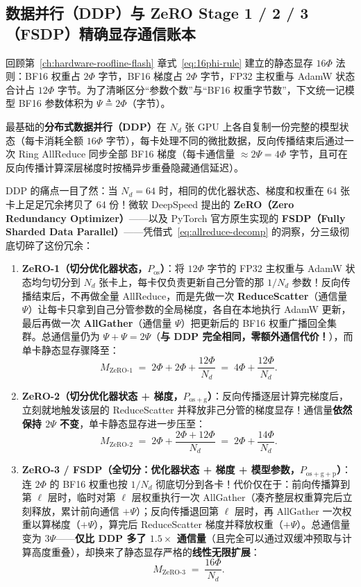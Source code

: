 \subsection{数据并行（DDP）与 ZeRO Stage 1 / 2 / 3（FSDP）精确显存通信账本}

回顾第~\ref{ch:hardware-roofline-flash} 章式~\eqref{eq:16phi-rule} 建立的静态显存 $16\Phi$ 法则：BF16 权重占 $2\Phi$ 字节，BF16 梯度占 $2\Phi$ 字节，FP32 主权重与 AdamW 状态合计占 $12\Phi$ 字节。为了清晰区分“参数个数”与“BF16 权重字节数”，下文统一记模型 BF16 参数体积为 $\Psi \triangleq 2\Phi$（字节）。

最基础的\textbf{分布式数据并行（DDP）}在 $N_d$ 张 GPU 上各自复制一份完整的模型状态（每卡消耗全额 $16\Phi$ 字节），每卡处理不同的微批数据，反向传播结束后通过一次 Ring AllReduce 同步全部 BF16 梯度（每卡通信量 $\approx 2\Psi = 4\Phi$ 字节，且可在反向传播计算深层梯度时按桶异步重叠隐藏通信延迟）。

DDP 的痛点一目了然：当 $N_d = 64$ 时，相同的优化器状态、梯度和权重在 64 张卡上足足冗余拷贝了 64 份！微软 DeepSpeed 提出的 \textbf{ZeRO（Zero Redundancy Optimizer）}——以及 PyTorch 官方原生实现的 \textbf{FSDP（Fully Sharded Data Parallel）}——凭借式~\eqref{eq:allreduce-decomp} 的洞察，分三级彻底切碎了这份冗余：
\begin{enumerate}
  \item \textbf{ZeRO-1（切分优化器状态，$P_{\mathrm{os}}$）}：将 $12\Phi$ 字节的 FP32 主权重与 AdamW 状态均匀切分到 $N_d$ 张卡上，每卡仅负责更新自己分管的那 $1/N_d$ 参数！反向传播结束后，不再做全量 AllReduce，而是先做一次 \textbf{ReduceScatter}（通信量 $\Psi$）让每卡只拿到自己分管参数的全局梯度，各自在本地执行 AdamW 更新，最后再做一次 \textbf{AllGather}（通信量 $\Psi$）把更新后的 BF16 权重广播回全集群。总通信量仍为 $\Psi + \Psi = 2\Psi$（\textbf{与 DDP 完全相同，零额外通信代价！}），而单卡静态显存骤降至：
  \[
    M_{\mathrm{ZeRO\text{-}1}} \;=\; 2\Phi + 2\Phi + \frac{12\Phi}{N_d} \;=\; 4\Phi + \frac{12\Phi}{N_d}.
  \]
  \item \textbf{ZeRO-2（切分优化器状态 + 梯度，$P_{\mathrm{os+g}}$）}：反向传播逐层计算完梯度后，立刻就地触发该层的 ReduceScatter 并释放非己分管的梯度显存！通信量\textbf{依然保持 $2\Psi$ 不变}，单卡静态显存进一步压至：
  \[
    M_{\mathrm{ZeRO\text{-}2}} \;=\; 2\Phi + \frac{2\Phi + 12\Phi}{N_d} \;=\; 2\Phi + \frac{14\Phi}{N_d}.
  \]
  \item \textbf{ZeRO-3 / FSDP（全切分：优化器状态 + 梯度 + 模型参数，$P_{\mathrm{os+g+p}}$）}：连 $2\Phi$ 的 BF16 权重也按 $1/N_d$ 彻底切分到各卡！代价仅在于：前向传播算到第 $\ell$ 层时，临时对第 $\ell$ 层权重执行一次 AllGather（凑齐整层权重算完后立刻释放，累计前向通信 $+\Psi$）；反向传播退回第 $\ell$ 层时，再 AllGather 一次权重以算梯度（$+\Psi$），算完后 ReduceScatter 梯度并释放权重（$+\Psi$）。总通信量变为 $3\Psi$——\textbf{仅比 DDP 多了 $1.5\times$ 通信量}（且完全可以通过双缓冲预取与计算高度重叠），却换来了静态显存严格的\textbf{线性无限扩展}：
  \[
    M_{\mathrm{ZeRO\text{-}3}} \;=\; \frac{16\Phi}{N_d}.
  \]
\end{enumerate}

